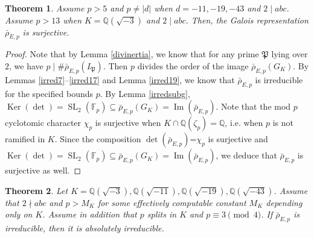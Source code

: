 \documentclass[]{article}
\newtheorem{theorem}{Theorem}
\newcommand {\QQ}{{\mathbb{Q}}}
\newcommand {\mfp}{{\mathfrak{P}}}
\DeclareMathOperator{\im}{Im}
\DeclareMathOperator{\Ker}{Ker}
\begin{document}
\begin{theorem}\label{surj}
Assume $p>5$ and $p\ne |d|$ when $d=-11,-19,-43$ and $2\mid abc$.
Assume $p>13$ when $K=\QQ(\sqrt{-3})$ and $2\mid abc$. Then, the Galois representation $\bar{\rho}_{E, p}$ is surjective.
\end{theorem}

\begin{proof}
   Note that by Lemma \ref{divinertia}, we know that for any prime $\mfp$ lying over $2$, we have $p \mid \# \bar{\rho}_{E, p}(I_{\mfp})$. Then $p$ divides the order of the image $\bar{\rho}_{E, p}(G_K)$. By Lemmas \ref{irred7}--\ref{irred17} and Lemma \ref{irred19}, we know that $\bar{\rho}_{E, p}$ is irreducible for the specified bounds $p$. By Lemma \ref{irredsubg}, $\Ker(\det)=\operatorname{SL}_2(\mathbb{F}_p)\subseteq \bar{\rho}_{E, p}(G_K)=\im(\bar{\rho}_{E, p})$. Note that the mod $p$ cyclotomic character $\chi_p$ is surjective when $K \cap \QQ(\zeta_p)=\QQ$, i.e. when $p$ is not ramified in $K$. Since the composition $\det(\bar{\rho}_{E, p})$=$\chi_p$ is surjective and $\Ker(\det)=\operatorname{SL}_2(\mathbb{F}_p)\subseteq \bar{\rho}_{E, p}(G_K)=\im(\bar{\rho}_{E, p})$, we deduce that $\bar{\rho}_{E, p}$ is surjective as well.
\end{proof}

\begin{theorem}
    Let $K=\QQ(\sqrt{-3}), \QQ(\sqrt{-11}), \QQ(\sqrt{-19}), \QQ(\sqrt{-43})$. Assume that $2\nmid abc$ and $p>M_K$ for some effectively computable constant $M_K$ depending only on $K$. Assume in addition that $p$ splits in $K$ and $p \equiv 3\pmod 4$. If $\bar{\rho}_{E, p}$ is irreducible, then it is absolutely irreducible. 
\end{theorem}
\end{document}
